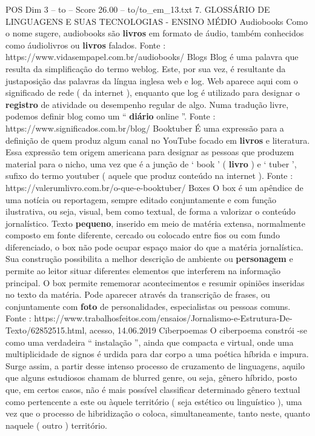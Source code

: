 \begin{textsample}{POS Dim 3 – to – Score 26.00 – to/to\_em\_13.txt}  \label{ex:f3_pos_104}
7.
GLOSSÁRIO DE LINGUAGENS E SUAS TECNOLOGIAS - ENSINO MÉDIO Audiobooks Como o nome sugere, audiobooks são \textbf{livros} em formato de áudio, também conhecidos como áudiolivros ou \textbf{livros} falados.
Fonte : https://www.vidasempapel.com.br/audiobooks/ Blogs Blog é uma palavra que resulta da simplificação do termo weblog.
Este, por sua vez, é resultante da justaposição das palavras da língua inglesa web e log.
Web aparece aqui com o significado de rede ( da internet ), enquanto que log é utilizado para designar o \textbf{registro} de atividade ou desempenho regular de algo.
Numa tradução livre, podemos definir blog como um “ \textbf{diário} online ”.
Fonte : https://www.significados.com.br/blog/ Booktuber É uma expressão para a definição de quem produz algum canal no YouTube focado em \textbf{livros} e literatura.
Essa expressão tem origem americana para designar as pessoas que produzem material para o nicho, uma vez que é a junção de ‘ book ’ ( \textbf{livro} ) e ‘ tuber ’, sufixo do termo youtuber ( aquele que produz conteúdo na internet ).
Fonte : https://valerumlivro.com.br/o-que-e-booktuber/ Boxes O box é um apêndice de uma notícia ou reportagem, sempre editado conjuntamente e com função ilustrativa, ou seja, visual, bem como textual, de forma a valorizar o conteúdo jornalístico.
Texto \textbf{pequeno}, inserido em meio de matéria extensa, normalmente composto em fonte diferente, cercado ou colocado entre fios ou com fundo diferenciado, o box não pode ocupar espaço maior do que a matéria jornalística.
Sua construção possibilita a melhor descrição de ambiente ou \textbf{personagem} e permite ao leitor situar diferentes elementos que interferem na informação principal.
O box permite rememorar acontecimentos e resumir opiniões inseridas no texto da matéria.
Pode aparecer através da transcrição de frases, ou conjuntamente com \textbf{foto} de personalidades, especialistas ou pessoas comuns.
Fonte : https://www.trabalhosfeitos.com/ensaios/Jornalismo-e-Estrutura-De-Texto/62852515.html, acesso, 14.06.2019 Ciberpoemas O ciberpoema constrói -se como uma verdadeira “ instalação ”, ainda que compacta e virtual, onde uma multiplicidade de signos é urdida para dar corpo a uma poética híbrida e impura.
Surge assim, a partir desse intenso processo de cruzamento de linguagens, aquilo que alguns estudiosos chamam de blurred genre, ou seja, gênero híbrido, posto que, em certos casos, não é mais possível classificar determinado gênero textual como pertencente a este ou àquele território ( seja estético ou linguístico ), uma vez que o processo de hibridização o coloca, simultaneamente, tanto neste, quanto naquele ( outro ) território.

\end{textsample}
